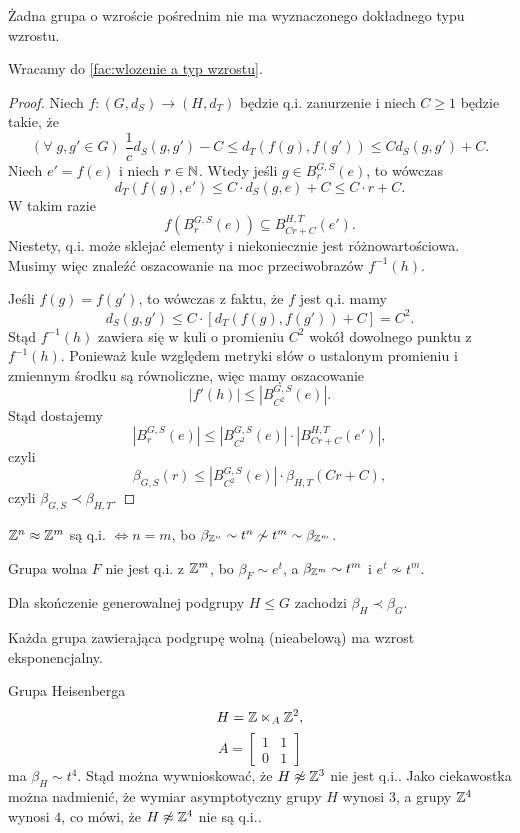 Żadna grupa o wzroście pośrednim nie ma wyznaczonego dokładnego typu wzrostu.

Wracamy do \ref{fac:wlozenie a typ wzrostu}.

\begin{proof}

  Niech $f:(G, d_S)\to (H, d_T)$ będzie q.i. zanurzenie i niech $C\geq 1$ będzie takie, że 
  $$(\forall\;g,g'\in G)\;\frac{1}{c}d_S(g, g') - C\leq d_T(f(g), f(g'))\leq Cd_S(g, g') + C.$$
  Niech $e'=f(e)$ i niech $r\in \mathbb{N}$. Wtedy jeśli $g\in B^{G,S}_r(e)$, to wówczas 
  $$d_T(f(g), e')\leq C\cdot d_S(g, e)+C\leq C\cdot r+C.$$
  W takim razie
  $$f\left(B_r^{G,S}(e)\right)\subseteq B_{Cr+C}^{H,T}(e').$$
  Niestety, q.i. może sklejać elementy i niekoniecznie jest różnowartościowa. Musimy więc znaleźć oszacowanie na moc przeciwobrazów $f^{-1}(h)$.

  Jeśli $f(g)=f(g')$, to wówczas z faktu, że $f$ jest q.i. mamy
  $$d_S(g, g')\leq C\cdot [d_T(f(g), f(g'))+C]=C^2.$$
  Stąd $f^{-1}(h)$ zawiera się w kuli o promieniu $C^2$ wokół dowolnego punktu z $f^{-1}(h)$. Ponieważ kule względem metryki słów o ustalonym promieniu i zmiennym środku są równoliczne, więc mamy oszacowanie
  $$|f'(h)|\leq \left| B_{C^2}^{G, S}(e) \right|.$$
  Stąd dostajemy 
  $$\left|B_r^{G,S}(e)\right| \leq \left| B_{C^2}^{G,S}(e) \right|\cdot \left| B_{Cr+C}^{H,T}(e') \right|, $$
  czyli 
  $$\beta_{G,S}(r)\leq \left| B_{C^2}^{G,S}(e) \right|\cdot \beta_{H,T}(Cr+C), $$
  czyli $\beta_{G,S}\prec \beta_{H,T}$.
\end{proof}

\begin{example}[m]
\item $\mathbb{Z}^n\approx \mathbb{Z}^m$ są q.i. $\iff n=m$, bo $\beta_{\mathbb{Z}^n}\sim t^n\not\sim t^m\sim \beta_{\mathbb{Z}^m}$.
\item Grupa wolna $F$ nie jest q.i. z $\mathbb{Z}^m$, bo $\beta_F\sim e^t$, a $\beta_{\mathbb{Z}^m}\sim t^m$ i $e^t\not\sim t^m$.
\item Dla skończenie generowalnej podgrupy $H\leq G$ zachodzi $\beta_H\prec\beta_G$.
  \begin{conclusion}{}{}
    Każda grupa zawierająca podgrupę wolną (nieabelową) ma wzrost eksponencjalny.
  \end{conclusion}
\item Grupa Heisenberga 
  $$H=\mathbb{Z}\ltimes_A \mathbb{Z}^2,$$ 
  $$A=\begin{bmatrix}1&1\\0&1\end{bmatrix}$$ 
  ma $\beta_H\sim t^4$. Stąd można wywnioskować, że $H\not\approx\mathbb{Z}^3$ nie jest q.i.. Jako ciekawostka można nadmienić, że wymiar asymptotyczny grupy $H$ wynosi $3$, a grupy $\mathbb{Z}^4$ wynosi $4$, co mówi, że $H\not\approx\mathbb{Z}^4$ nie są q.i..
\end{example}

